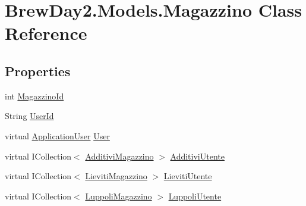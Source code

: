 \hypertarget{class_brew_day2_1_1_models_1_1_magazzino}{}\section{Brew\+Day2.\+Models.\+Magazzino Class Reference}
\label{class_brew_day2_1_1_models_1_1_magazzino}
\subsection*{Properties}
\begin{DoxyCompactItemize}
\item 
int \mbox{\hyperlink{class_brew_day2_1_1_models_1_1_magazzino_a1f1b2a8b6de28e4985f55c947437c84f}{Magazzino\+Id}}
\item 
String \mbox{\hyperlink{class_brew_day2_1_1_models_1_1_magazzino_abf1f9156076ddc2c5d639bf9ee376c03}{User\+Id}}
\item 
virtual \mbox{\hyperlink{class_brew_day2_1_1_models_1_1_application_user}{Application\+User}} \mbox{\hyperlink{class_brew_day2_1_1_models_1_1_magazzino_aca78dc87e773562fbd0714b1d9574ff3}{User}}
\item 
virtual I\+Collection$<$ \mbox{\hyperlink{class_brew_day2_1_1_models_1_1_additivi_magazzino}{Additivi\+Magazzino}} $>$ \mbox{\hyperlink{class_brew_day2_1_1_models_1_1_magazzino_ab4f37d277f6de51f9812882f8f1bf689}{Additivi\+Utente}}
\item 
virtual I\+Collection$<$ \mbox{\hyperlink{class_brew_day2_1_1_models_1_1_lieviti_magazzino}{Lieviti\+Magazzino}} $>$ \mbox{\hyperlink{class_brew_day2_1_1_models_1_1_magazzino_a0e8192ed1f2c332af0a0497b1b47e4c8}{Lieviti\+Utente}}
\item 
virtual I\+Collection$<$ \mbox{\hyperlink{class_brew_day2_1_1_models_1_1_luppoli_magazzino}{Luppoli\+Magazzino}} $>$ \mbox{\hyperlink{class_brew_day2_1_1_models_1_1_magazzino_a643073b37dbc320594c9e927abbba0b4}{Luppoli\+Utente}}
\item 

\end{DoxyCompactItemize}

